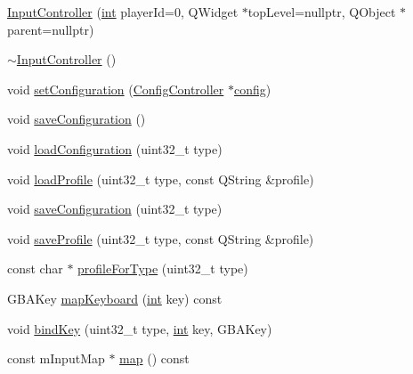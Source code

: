 \begin{DoxyCompactItemize}
\item 
\mbox{\hyperlink{class_q_g_b_a_1_1_input_controller_abb5bdd6a31f0abf700e8052bececaae0}{Input\+Controller}} (\mbox{\hyperlink{ioapi_8h_a787fa3cf048117ba7123753c1e74fcd6}{int}} player\+Id=0, Q\+Widget $\ast$top\+Level=nullptr, Q\+Object $\ast$parent=nullptr)
\item 
\mbox{\hyperlink{class_q_g_b_a_1_1_input_controller_aa36b76b8144da60b26cd9b8298aa5627}{$\sim$\+Input\+Controller}} ()
\item 
void \mbox{\hyperlink{class_q_g_b_a_1_1_input_controller_afea2c3e3f7d19b60ea6903b19b9630de}{set\+Configuration}} (\mbox{\hyperlink{class_q_g_b_a_1_1_config_controller}{Config\+Controller}} $\ast$\mbox{\hyperlink{deflate_8c_a4473b5227787415097004fd39f55185e}{config}})
\item 
void \mbox{\hyperlink{class_q_g_b_a_1_1_input_controller_a2adb9fc74465b49f0730fdcf034e05bd}{save\+Configuration}} ()
\item 
void \mbox{\hyperlink{class_q_g_b_a_1_1_input_controller_ad008a966ed0e680b06f1883bbfb0829d}{load\+Configuration}} (uint32\+\_\+t type)
\item 
void \mbox{\hyperlink{class_q_g_b_a_1_1_input_controller_a711e7514a7fb09f023cb388b19fc8fd5}{load\+Profile}} (uint32\+\_\+t type, const Q\+String \&profile)
\item 
void \mbox{\hyperlink{class_q_g_b_a_1_1_input_controller_a161357b346c5e579e79ad28c6b6c4686}{save\+Configuration}} (uint32\+\_\+t type)
\item 
void \mbox{\hyperlink{class_q_g_b_a_1_1_input_controller_a9efdf161c3186274d0ddcaa1f4e9e56b}{save\+Profile}} (uint32\+\_\+t type, const Q\+String \&profile)
\item 
const char $\ast$ \mbox{\hyperlink{class_q_g_b_a_1_1_input_controller_abdbd46077ab5cb86216e3119c3370210}{profile\+For\+Type}} (uint32\+\_\+t type)
\item 
G\+B\+A\+Key \mbox{\hyperlink{class_q_g_b_a_1_1_input_controller_a0b30490d7d98cf90002e1d7d4a9dde01}{map\+Keyboard}} (\mbox{\hyperlink{ioapi_8h_a787fa3cf048117ba7123753c1e74fcd6}{int}} key) const
\item 
void \mbox{\hyperlink{class_q_g_b_a_1_1_input_controller_ac603f8f09a8a04ed84dbec5dfcc3db56}{bind\+Key}} (uint32\+\_\+t type, \mbox{\hyperlink{ioapi_8h_a787fa3cf048117ba7123753c1e74fcd6}{int}} key, G\+B\+A\+Key)
\item 
const m\+Input\+Map $\ast$ \mbox{\hyperlink{class_q_g_b_a_1_1_input_controller_a7b4aaedf3b76edb0490967bfbff6f32e}{map}} () const

\end{DoxyCompactItemize}
